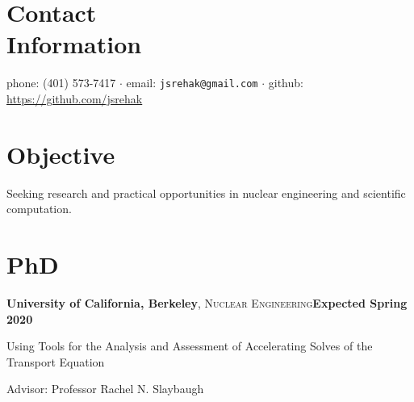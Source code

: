 \documentclass[margin,line]{resume}
\begin{document}
\begin{resume}
  \section{\mysidestyle Contact\\Information}
  phone: (401) 573-7417 $\cdot$ email: \verb`jsrehak@gmail.com`
  $\cdot$ github: \url{https://github.com/jsrehak}\hfill \\

    \section{\mysidestyle Objective}
                Seeking research and practical opportunities in nuclear engineering and scientific computation.%
    \section{\mysidestyle PhD}
    \textbf{University of California, Berkeley}, \textsc{Nuclear
      Engineering}\hfill \textbf{Expected Spring 2020}\vspace{-3mm}\\\vspace{-1mm}%
    \begin{list2}
        \item[] Using Tools for the Analysis and Assessment of Accelerating Solves of the Transport Equation
        \item[] Advisor:  Professor Rachel N. Slaybaugh
    \end{list2}\vspace{-1.5mm}

\end{resume}
\end{document}
